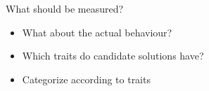 \begin{frame}{What should be measured?}
  \begin{itemize}
    \item What about the actual behaviour?
    \item Which traits do candidate solutions have?
    \item Categorize according to traits
  \end{itemize}
\end{frame}


